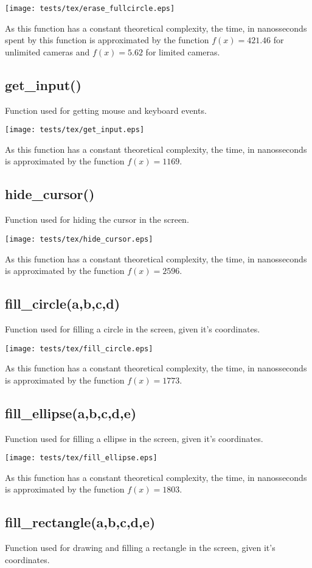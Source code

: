 \documentclass{article}
\begin{document}
\texttt{[image: tests/tex/erase\_fullcircle.eps]}

As this function has a constant
theoretical complexity, the time, in nanosseconds
spent by this function is 
approximated by the function $f(x)=421.46$
for unlimited cameras and $f(x)=5.62$ for
limited cameras.
\subsection{get\_input()}
Function used for getting mouse and keyboard events.


\texttt{[image: tests/tex/get\_input.eps]}

As this function has a constant theoretical
complexity, the time, in nanosseconds is 
approximated by the function $f(x)=1169$.
\subsection{hide\_cursor()}
Function used for hiding the cursor in the screen.


\texttt{[image: tests/tex/hide\_cursor.eps]}

As this function has a constant theoretical
complexity, the time, in nanosseconds is 
approximated by the function $f(x)=2596$.
\subsection{fill\_circle(a,b,c,d)}
Function used for filling a circle in the
screen, given it's coordinates. 

\texttt{[image: tests/tex/fill\_circle.eps]}

As this function has a constant theoretical
complexity, the time, in nanosseconds is 
approximated by the function $f(x)=1773$.
\subsection{fill\_ellipse(a,b,c,d,e)}
Function used for filling a ellipse in the
screen, given it's coordinates. 

\texttt{[image: tests/tex/fill\_ellipse.eps]}

As this function has a constant theoretical
complexity, the time, in nanosseconds is 
approximated by the function $f(x)=1803$.
\subsection{fill\_rectangle(a,b,c,d,e)}
Function used for drawing and filling a rectangle in the
screen, given it's coordinates. 
\end{document}
